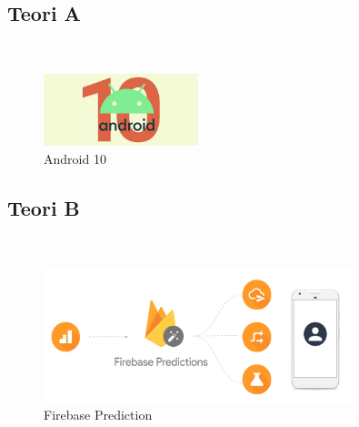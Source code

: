 \chapter{\babDua}


\section{Teori A}

\blindtext \cite{Hoffstein1998,Saxena2018,cloud} \\

\begin{figure}
	\centering
	\includegraphics[width=0.4\textwidth]
	{pics/android-10.jpg}
	\caption{Android 10}
	\label{fig:1}
\end{figure}

\section{Teori B}

\blindtext \cite{Joshi2015,storage} \\

\begin{figure}
	\centering
	\includegraphics[width=0.8\textwidth]
	{pics/FirebasePre.png}
	\caption{Firebase Prediction}
	\label{fig:2}
\end{figure}

